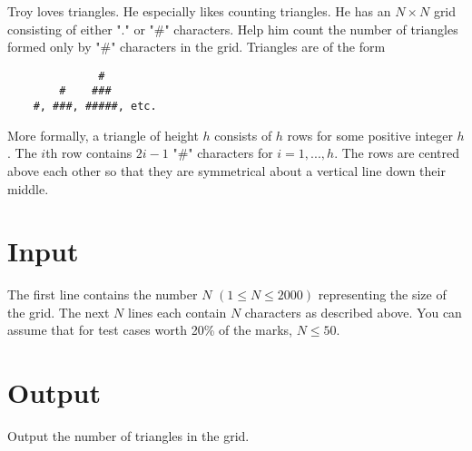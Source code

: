 Troy loves triangles. He especially likes counting triangles. He has an $N \times N$ grid consisting
of either "." or "\#" characters. Help him count the number of triangles formed only by "\#"
characters in the grid. Triangles are of the form
\begin{verbatim}
              #
        #    ###
    #, ###, #####, etc.
\end{verbatim}

More formally, a triangle of height $h$ consists of $h$ rows for some positive integer $h$. The $i$th row contains $2i-1$ "\#" characters for $i = 1,...,h$. The rows are centred above each other so that they are symmetrical about a vertical line down their middle.


\section*{Input}
The first line contains the number $N$ $(1 \leq N \leq 2000)$ representing the size of the grid. The next $N$ lines each contain $N$ characters as described above. You can assume that for test cases worth 20\% of the marks, $N \leq 50$.

\section*{Output}
Output the number of triangles in the grid.
